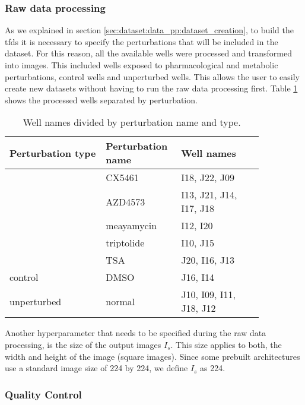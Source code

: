 \subsubsection{Raw data processing}

As we explained in section \ref{sec:dataset:data_pp:dataset_creation}, to build the \gls{tfds} it is necessary to specify the perturbations that will be included in the dataset. For this reason, all the available wells were processed and transformed into images. This included wells exposed to pharmacological and metabolic perturbations, control wells and unperturbed wells. This allows the user to easily create new datasets without having to run the raw data processing first. Table \ref{table:methodology:dataset:raw_data} shows the processed wells separated by perturbation.

\begin{table}[!ht]
  \centering
  \begin{tabular}{>{\centering\arraybackslash}m{0.35\linewidth} | >{\centering\arraybackslash}m{0.2\linewidth} | >{\centering\arraybackslash}m{0.3\linewidth}}
    \hline
    Perturbation type & Perturbation name & Well names \\
    \hline
    \multirow{5}{*}{pharmacological/metabolic} & CX5461 & I18, J22, J09 \\
    \cline{2-3}
     & AZD4573 & I13, J21, J14, I17, J18 \\
    \cline{2-3}
     & meayamycin & I12, I20 \\
    \cline{2-3}
    & triptolide & I10, J15 \\
    \cline{2-3}
    & TSA & J20, I16, J13 \\
    \hline
    control & DMSO & J16, I14 \\
    \hline
    unperturbed & normal & J10, I09, I11, J18, J12 \\
    \hline
  \end{tabular}
  \caption{Well names divided by perturbation name and type.}
  \label{table:methodology:dataset:raw_data}
\end{table}

Another hyperparameter that needs to be specified during the raw data processing, is the size of the output images $I_s$. This size applies to both, the width and height of the image (square images). Since some prebuilt architectures use a standard image size of 224 by 224, we define $I_s$ as 224.

\subsubsection{Quality Control}

